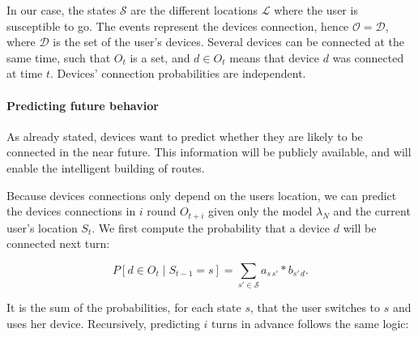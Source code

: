 In our case, the states $\mathcal{S}$ are the different locations $\mathcal{L}$ where the user is susceptible to go.
The events represent the devices connection, hence $\mathcal{O} = \mathcal{D}$, where $\mathcal{D}$ is the set of the user's devices.
Several devices can be connected at the same time, such that $O_t$ is a set, and $d \in O_t$ means that device $d$ was connected at time $t$. Devices' connection probabilities are independent.




\paragraph*{Predicting future behavior} 
As already stated, devices want to predict whether they are likely to be connected in the near future.
This information will be publicly available, and will enable the intelligent building of routes.

Because devices connections only depend on the users location, we can predict the devices connections in $i$ round $O_{t+i}$ given only the model $\lambda_N$ and the current user's location $S_t$. We first compute the probability that a device $d$ will be connected next turn:

$$
P\left[ d \in O_{t} \mid S_{t-1} = s \right] = 
\sum\limits_{s' \in \mathcal{S}} 
a_{s\,s'} * b_{s'\,d}.
$$

It is the sum of the probabilities, for each state $s$, that the user switches to $s$ and uses her device.
Recursively, predicting $i$ turns in advance follows the same logic:


